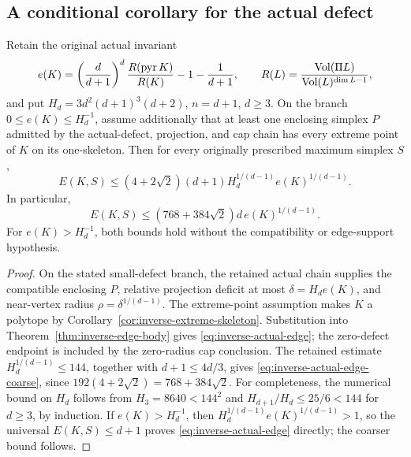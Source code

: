 \subsection{A conditional corollary for the actual defect}

\begin{corollary}
\label{cor:inverse-actual-defect}
Retain the original actual invariant
\begin{equation}
 e(K)=\left(\frac d{d+1}\right)^d
       \frac{R(\operatorname{pyr} K)}{R(K)}-1-\frac1{d+1},
 \qquad
 R(L)=\frac{\operatorname{Vol}(\Pi L)}{\operatorname{Vol}(L)^{\dim L-1}},
 \label{eq:inverse-original-defect}
\end{equation}
and put $H_d=3d^2(d+1)^3(d+2)$, $n=d+1$, $d\geq3$.
On the branch $0\leq e(K)\leq H_d^{-1}$, assume additionally that
at least one enclosing simplex $P$ admitted by the actual-defect,
projection, and cap chain has every extreme point of $K$ on its
one-skeleton.  Then for every originally prescribed maximum simplex
$S$,
\begin{equation}
 E(K,S)\leq(4+2\sqrt2)(d+1)H_d^{1/(d-1)}
                         e(K)^{1/(d-1)}.
 \label{eq:inverse-actual-edge}
\end{equation}
In particular,
\begin{equation}
 E(K,S)\leq(768+384\sqrt2)d\,e(K)^{1/(d-1)}.
 \label{eq:inverse-actual-edge-coarse}
\end{equation}
For $e(K)>H_d^{-1}$, both bounds hold without the compatibility or
edge-support hypothesis.
\end{corollary}

\begin{proof}
On the stated small-defect branch, the retained actual chain
supplies the compatible enclosing $P$, relative projection deficit
at most $\delta=H_de(K)$, and near-vertex radius
$\rho=\delta^{1/(d-1)}$.  The extreme-point assumption makes $K$
a polytope by Corollary~\ref{cor:inverse-extreme-skeleton}.
Substitution into Theorem~\ref{thm:inverse-edge-body} gives
\eqref{eq:inverse-actual-edge}; the zero-defect endpoint is included
by the zero-radius cap conclusion.  The retained estimate
$H_d^{1/(d-1)}\leq144$, together with $d+1\leq4d/3$, gives
\eqref{eq:inverse-actual-edge-coarse}, since
$192(4+2\sqrt2)=768+384\sqrt2$.
For completeness, the numerical bound on $H_d$ follows from
$H_3=8640<144^2$ and
$H_{d+1}/H_d\leq25/6<144$ for $d\geq3$, by induction.
If $e(K)>H_d^{-1}$, then $H_d^{1/(d-1)}e(K)^{1/(d-1)}>1$,
so the universal $E(K,S)\leq d+1$ proves
\eqref{eq:inverse-actual-edge} directly; the coarser bound follows.
\end{proof}

